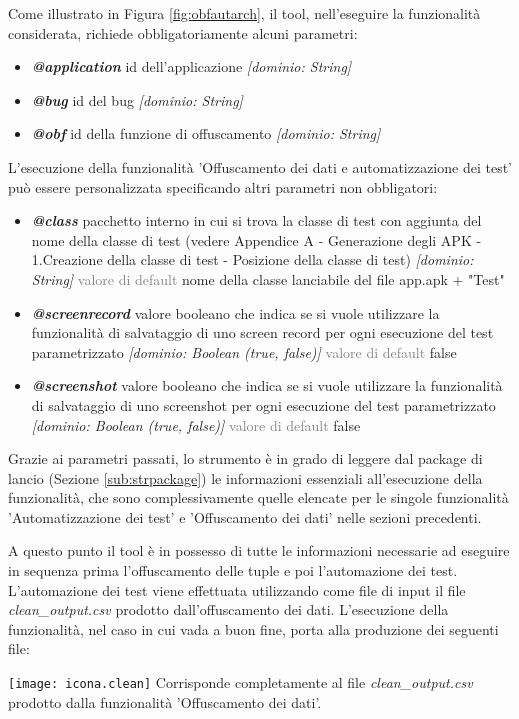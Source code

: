 Come illustrato in Figura \ref{fig:obfautarch}, il tool, nell'eseguire la funzionalità considerata, richiede obbligatoriamente alcuni parametri:
\begin{itemize} [nosep]
\item \textbf{\emph{@application}} id dell'applicazione \emph{[dominio: String]}
\item \textbf{\emph{@bug}} id del bug \emph{[dominio: String]}
\item \textbf{\emph{@obf}} id della funzione di offuscamento \emph{[dominio: String]}
\end{itemize}
\newpage
\noindent L'esecuzione della funzionalità 'Offuscamento dei dati e automatizzazione dei test' può essere personalizzata specificando altri parametri non obbligatori:
\begin{itemize} [nosep]
\item \textbf{\emph{@class}} pacchetto interno in cui si trova la classe di test con aggiunta del nome della classe di test (vedere Appendice A - Generazione degli APK - 1.Creazione della classe di test - Posizione della classe di test) \emph{[dominio: String]} \newline
\textcolor{gray}{valore di default} nome della classe lanciabile del file app.apk + "Test" 
\item \textbf{\emph{@screenrecord}} valore booleano che indica se si vuole utilizzare la funzionalità di salvataggio di uno screen record per ogni esecuzione del test parametrizzato  \emph{[dominio: Boolean (true, false)]} \newline
\textcolor{gray}{valore di default} false
\item \textbf{\emph{@screenshot}} valore booleano che indica se si vuole utilizzare la funzionalità di salvataggio di uno screenshot per ogni esecuzione del test parametrizzato  \emph{[dominio: Boolean (true, false)]} \newline
\textcolor{gray}{valore di default} false
\end{itemize}
\bigskip

\noindent Grazie ai parametri passati, lo strumento è in grado di leggere dal package di lancio (Sezione \ref{sub:strpackage}) le informazioni essenziali all'esecuzione della funzionalità, che sono complessivamente quelle elencate per le singole funzionalità 'Automatizzazione dei test' e 'Offuscamento dei dati' nelle sezioni precedenti.

\noindent A questo punto il tool è in possesso di tutte le informazioni necessarie ad eseguire in sequenza prima l'offuscamento delle tuple e poi l'automazione dei test. L'automazione dei test viene effettuata utilizzando come file di input il file \emph{clean\_output.csv} prodotto dall'offuscamento dei dati.
\bigskip \newline  
\noindent L'esecuzione della funzionalità, nel caso in cui vada a buon fine, porta alla produzione dei seguenti file:
\begin{tcolorbox}[colback=white, colframe=lightgray]
	 \texttt{[image: icona.clean]} \newline
Corrisponde completamente al file \emph{clean\_output.csv} prodotto dalla funzionalità 'Offuscamento dei dati'. 
\end{tcolorbox}

